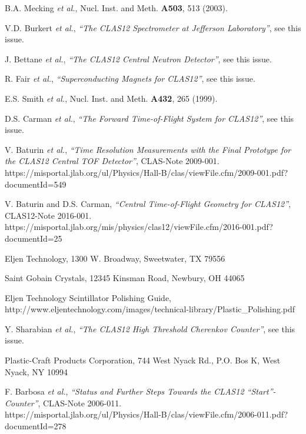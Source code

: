 \documentclass{elsart}
\begin{document}
\begin{thebibliography}{99}

B.A. Mecking {\it et al.}, Nucl. Inst. and Meth. {\bf A503}, 513 (2003).

V.D. Burkert {\it et al.}, {\it ``The CLAS12 Spectrometer at Jefferson Laboratory''}, see this issue.

J. Bettane {\it et al.}, {\it ``The CLAS12 Central Neutron Detector''}, see this issue.

R. Fair {\it et al.}, {\it ``Superconducting Magnets for CLAS12''}, see this issue.  

E.S. Smith {\it et al.}, Nucl. Inst. and Meth. {\bf A432}, 265 (1999).

D.S. Carman {\it et al.}, {\it ``The Forward Time-of-Flight System for CLAS12''}, see this issue.

V. Baturin {\it et al.}, {\it ``Time Resolution Measurements with the Final Prototype for the 
CLAS12 Central TOF Detector''}, CLAS-Note 2009-001.\\
https://misportal.jlab.org/ul/Physics/Hall-B/clas/viewFile.cfm/2009-001.pdf?documentId=549

V. Baturin and D.S. Carman, {\it ``Central Time-of-Flight Geometry for CLAS12''}, CLAS12-Note 
2016-001.\\
https://misportal.jlab.org/mis/physics/clas12/viewFile.cfm/2016-001.pdf?documentId=25

Eljen Technology, 1300 W. Broadway, Sweetwater, TX 79556

Saint Gobain Crystals, 12345 Kinsman Road, Newbury, OH 44065

Eljen Technology Scintillator Polishing Guide,\\
http://www.eljentechnology.com/images/technical-library/Plastic\_Polishing.pdf

Y. Sharabian {\it et al.}, {\it ``The CLAS12 High Threshold Cherenkov Counter''}, see this issue.
  
Plastic-Craft Products Corporation, 744 West Nyack Rd., P.O. Bos K, West Nyack, NY 10994

F. Barbosa {\it et al.}, {\it ``Status and Further Steps Towards the CLAS12 ``Start''-Counter''},
CLAS-Note 2006-011.\\
https://misportal.jlab.org/ul/Physics/Hall-B/clas/viewFile.cfm/2006-011.pdf?documentId=278


\end{thebibliography}
\end{document}

